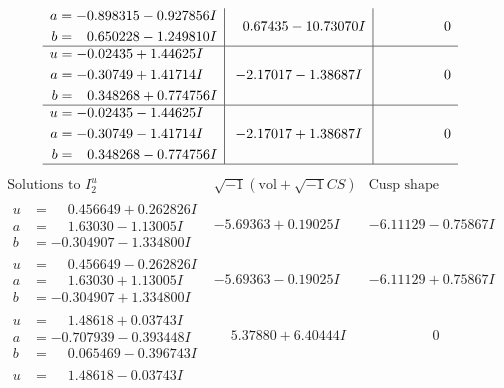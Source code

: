 \documentclass[1p]{elsarticle_modified}
\theoremstyle{definition}
\newcommand{\I}{\sqrt{-1}}
\begin{document}
$$\begin{array}{c|c|c}
\begin{aligned}
a &= -0.898315 - 0.927856 I \\
b &= \phantom{-}0.650228 - 1.249810 I\end{aligned}
 & \phantom{-}0.67435 - 10.73070 I & \phantom{-0.000000 } 0 \\ \hline\begin{aligned}
u &= -0.02435 + 1.44625 I \\
a &= -0.30749 + 1.41714 I \\
b &= \phantom{-}0.348268 + 0.774756 I\end{aligned}
 & -2.17017 - 1.38687 I & \phantom{-0.000000 } 0 \\ \hline\begin{aligned}
u &= -0.02435 - 1.44625 I \\
a &= -0.30749 - 1.41714 I \\
b &= \phantom{-}0.348268 - 0.774756 I\end{aligned}
 & -2.17017 + 1.38687 I & \phantom{-0.000000 } 0\\
 \hline 
 \end{array}$$\newpage$$\begin{array}{c|c|c}  
\text{Solutions to }I^u_{2}& \I (\text{vol} + \sqrt{-1}CS) & \text{Cusp shape}\\
 \hline 
\begin{aligned}
u &= \phantom{-}0.456649 + 0.262826 I \\
a &= \phantom{-}1.63030 - 1.13005 I \\
b &= -0.304907 - 1.334800 I\end{aligned}
 & -5.69363 + 0.19025 I & -6.11129 - 0.75867 I \\ \hline\begin{aligned}
u &= \phantom{-}0.456649 - 0.262826 I \\
a &= \phantom{-}1.63030 + 1.13005 I \\
b &= -0.304907 + 1.334800 I\end{aligned}
 & -5.69363 - 0.19025 I & -6.11129 + 0.75867 I \\ \hline\begin{aligned}
u &= \phantom{-}1.48618 + 0.03743 I \\
a &= -0.707939 - 0.393448 I \\
b &= \phantom{-}0.065469 - 0.396743 I\end{aligned}
 & \phantom{-}5.37880 + 6.40444 I & \phantom{-0.000000 } 0 \\ \hline\begin{aligned}
u &= \phantom{-}1.48618 - 0.03743 I \\

\end{aligned}
\end{array}$$
\end{document}
